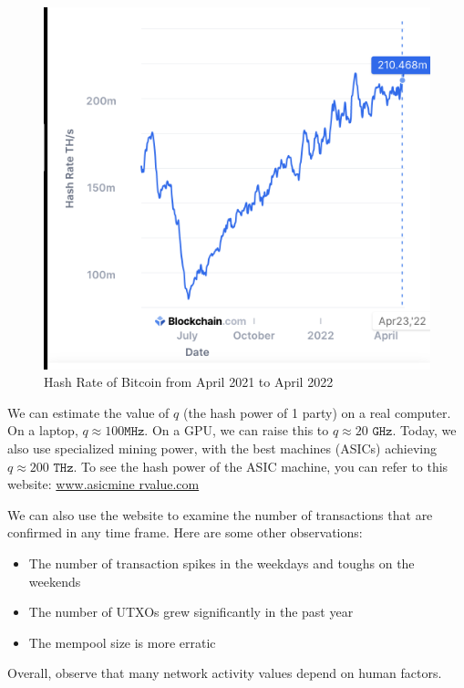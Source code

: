 \begin{figure}[ht]
    \centering
    \includegraphics[scale = 0.6]{figures/hash_rate.png}
    \caption{Hash Rate of Bitcoin from April 2021 to April 2022\cite{hash-rate}}
    \label{fig:hash_rate}
\end{figure}

We can estimate the value of $q$ (the hash power of 1 party) on a real computer. On a laptop, $q \approx 100 \texttt{MHz}$. On a GPU, we can raise this to $q \approx 20 \texttt{ GHz}$. Today, we also use specialized mining power, with the best machines (ASICs) achieving $q \approx 200 \texttt{ THz}$. To see the hash power of the ASIC machine, you can refer to this website: \href{www.asicminervalue.com}{www.asicmine
rvalue.com}

We can also use the website to examine the number of transactions that are confirmed in any time frame. Here are some other observations:
\begin{itemize}
    \item The number of transaction spikes in the weekdays and toughs on the weekends
    \item The number of UTXOs grew significantly in the past year
    \item The mempool size is more erratic
\end{itemize}
Overall, observe that many network activity values depend on human factors.

